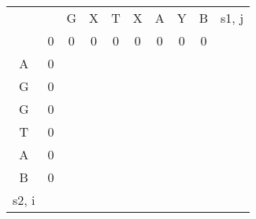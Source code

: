 \begin{center}
	\begin{tabular}{cccccccccl}
		                          &                        & G                      & X                      & T                      & X                      & A                      & Y                      & B                      & s1, j \\ \cline{2-9}
		\multicolumn{1}{c|}{}     & \multicolumn{1}{c|}{0} & \multicolumn{1}{c|}{0} & \multicolumn{1}{c|}{0} & \multicolumn{1}{c|}{0} & \multicolumn{1}{c|}{0} & \multicolumn{1}{c|}{0} & \multicolumn{1}{c|}{0} & \multicolumn{1}{c|}{0} &       \\ \cline{2-9}
		\multicolumn{1}{c|}{A}    & \multicolumn{1}{c|}{0} & \multicolumn{1}{c|}{}  & \multicolumn{1}{c|}{}  & \multicolumn{1}{c|}{}  & \multicolumn{1}{c|}{}  & \multicolumn{1}{c|}{}  & \multicolumn{1}{c|}{}  & \multicolumn{1}{c|}{}  &       \\ \cline{2-9}
		\multicolumn{1}{c|}{G}    & \multicolumn{1}{c|}{0} & \multicolumn{1}{c|}{}  & \multicolumn{1}{c|}{}  & \multicolumn{1}{c|}{}  & \multicolumn{1}{c|}{}  & \multicolumn{1}{c|}{}  & \multicolumn{1}{c|}{}  & \multicolumn{1}{c|}{}  &       \\ \cline{2-9}
		\multicolumn{1}{c|}{G}    & \multicolumn{1}{c|}{0} & \multicolumn{1}{c|}{}  & \multicolumn{1}{c|}{}  & \multicolumn{1}{c|}{}  & \multicolumn{1}{c|}{}  & \multicolumn{1}{c|}{}  & \multicolumn{1}{c|}{}  & \multicolumn{1}{c|}{}  &       \\ \cline{2-9}
		\multicolumn{1}{c|}{T}    & \multicolumn{1}{c|}{0} & \multicolumn{1}{c|}{}  & \multicolumn{1}{c|}{}  & \multicolumn{1}{c|}{}  & \multicolumn{1}{c|}{}  & \multicolumn{1}{c|}{}  & \multicolumn{1}{c|}{}  & \multicolumn{1}{c|}{}  &       \\ \cline{2-9}
		\multicolumn{1}{c|}{A}    & \multicolumn{1}{c|}{0} & \multicolumn{1}{c|}{}  & \multicolumn{1}{c|}{}  & \multicolumn{1}{c|}{}  & \multicolumn{1}{c|}{}  & \multicolumn{1}{c|}{}  & \multicolumn{1}{c|}{}  & \multicolumn{1}{c|}{}  &       \\ \cline{2-9}
		\multicolumn{1}{c|}{B}    & \multicolumn{1}{c|}{0} & \multicolumn{1}{c|}{}  & \multicolumn{1}{c|}{}  & \multicolumn{1}{c|}{}  & \multicolumn{1}{c|}{}  & \multicolumn{1}{c|}{}  & \multicolumn{1}{c|}{}  & \multicolumn{1}{c|}{}  &       \\ \cline{2-9}
		\multicolumn{1}{l}{s2, i} & \multicolumn{1}{l}{}   & \multicolumn{1}{l}{}   & \multicolumn{1}{l}{}   & \multicolumn{1}{l}{}   & \multicolumn{1}{l}{}   & \multicolumn{1}{l}{}   & \multicolumn{1}{l}{}   & \multicolumn{1}{l}{}   &
	\end{tabular}
\end{center}

